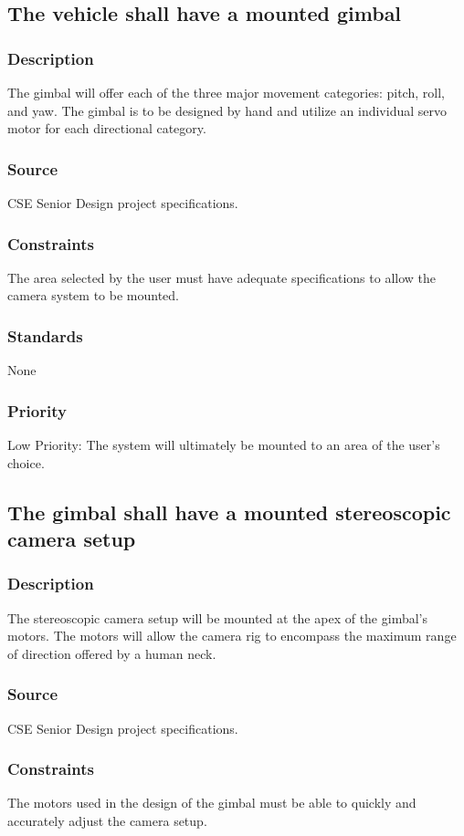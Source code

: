 
\subsection{The vehicle shall have a mounted gimbal}
\subsubsection{Description}
The gimbal will offer each of the three major movement categories: pitch, roll, and yaw. The gimbal is to be designed by hand and utilize an individual servo motor for each directional category.
\subsubsection{Source}
CSE Senior Design project specifications.
\subsubsection{Constraints}
The area selected by the user must have adequate specifications to allow the camera system to be mounted.
\subsubsection{Standards}
None
\subsubsection{Priority}
Low Priority: The system will ultimately be mounted to an area of the user's choice.

\subsection{The gimbal shall have a mounted stereoscopic camera setup}
\subsubsection{Description}
The stereoscopic camera setup will be mounted at the apex of the gimbal's motors. The motors will allow the camera rig to encompass the maximum range of direction offered by a human neck.
\subsubsection{Source}
CSE Senior Design project specifications.
\subsubsection{Constraints}
The motors used in the design of the gimbal must be able to quickly and accurately adjust the camera setup. 

